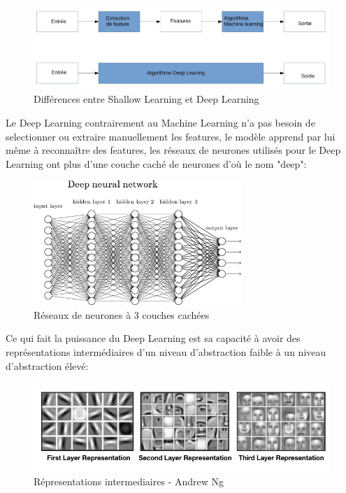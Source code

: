             \begin{figure}[H]
                \centering
                \includegraphics[width=1\textwidth]{Images/MLvsDL}
                \caption{Différences entre Shallow Learning et Deep Learning}
                \label{fig:DiffMLDL}
            \end{figure}

            Le Deep Learning contrairement au Machine Learning n'a pas besoin de selectionner
            ou extraire manuellement les features, le modèle apprend par lui même à reconnaître
            des features, les réseaux de neurones utilisés pour le Deep Learning
            ont plus d'une couche caché de neurones d'où le nom "deep": \newline

            \begin{figure}[H]
                \centering
                \includegraphics[width=0.7\textwidth]{Images/deepnn}
                \caption{Réseaux de neurones à 3 couches cachées}
                \label{fig:deepneuralnetwork}
            \end{figure}

            Ce qui fait la puissance du Deep Learning est sa capacité à avoir des représentations
            intermédiaires d'un niveau d'abstraction faible à un niveau d'abstraction élevé:

            \begin{figure}[H]
                \centering
                \includegraphics[width=1\textwidth]{Images/layeredrepresentation}
                \caption{Répresentations intermediaires - Andrew Ng}
                \label{fig:deepnnrepresentation}
            \end{figure}

